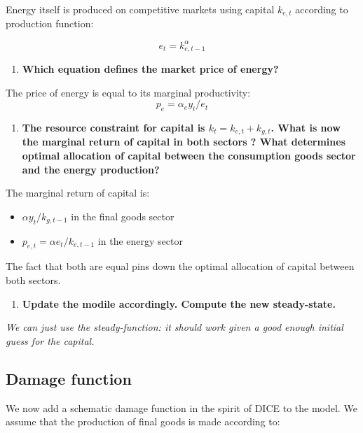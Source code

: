 \documentclass[
  letterpaper,
  DIV=11,
  numbers=noendperiod]{scrartcl}
\providecommand{\tightlist}{%
  \setlength{\itemsep}{0pt}\setlength{\parskip}{0pt}}\usepackage{longtable,booktabs,array}
\begin{document}
Energy itself is produced on competitive markets using capital
\(k_{e,t}\) according to production function:

\[e_{t} = k_{e,t-1}^{\alpha}\]

\begin{enumerate}
\def\labelenumi{\arabic{enumi}.}
\setcounter{enumi}{5}
\tightlist
\item
  \textbf{Which equation defines the market price of energy?}
\end{enumerate}

The price of energy is equal to its marginal productivity:
\[p_e = \alpha_e y_t / e_t\]

\begin{enumerate}
\def\labelenumi{\arabic{enumi}.}
\setcounter{enumi}{6}
\tightlist
\item
  \textbf{The resource constraint for capital is
  \(k_t = k_{e,t} + k_{g,t}\). What is now the marginal return of
  capital in both sectors ? What determines optimal allocation of
  capital between the consumption goods sector and the energy
  production?}
\end{enumerate}

The marginal return of capital is:

\begin{itemize}
\tightlist
\item
  \(\alpha y_t / k_{g,t-1}\) in the final goods sector
\item
  \(p_{e,t} = \alpha e_t / k_{e,t-1}\) in the energy sector
\end{itemize}

The fact that both are equal pins down the optimal allocation of capital
between both sectors.

\begin{enumerate}
\def\labelenumi{\arabic{enumi}.}
\setcounter{enumi}{7}
\tightlist
\item
  \textbf{Update the modile accordingly. Compute the new steady-state.}
\end{enumerate}

\emph{We can just use the steady-function: it should work given a good
enough initial guess for the capital.}

\subsection{Damage function}\label{damage-function}

We now add a schematic damage function in the spirit of DICE to the
model. We assume that the production of final goods is made according
to:
\end{document}

